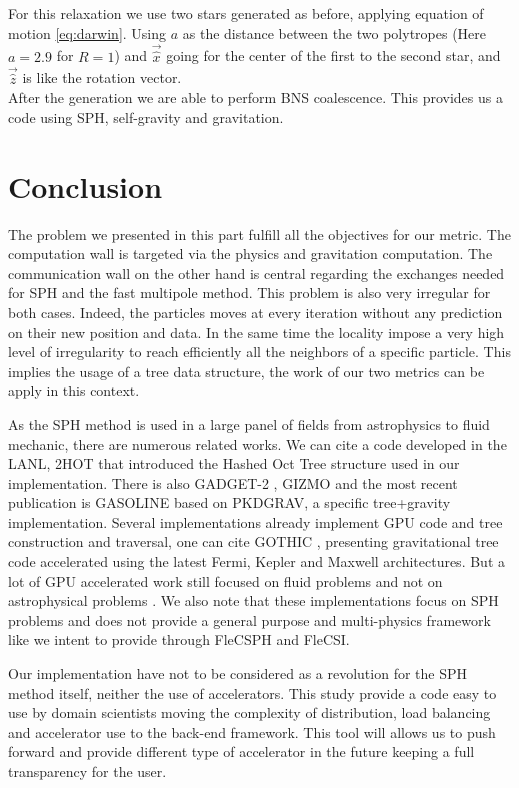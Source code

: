 For this relaxation we use two stars generated as before, applying equation of motion \ref{eq:darwin}.
Using $a$ as the distance between the two polytropes  (Here $a=2.9$ for $R=1$) and $\vec{\hat{x}}$ going for the center of the first to the second star, and $\vec{\hat{z}}$ is like the rotation vector.\\

After the generation we are able to perform BNS coalescence. 
This provides us a code using SPH, self-gravity and gravitation. 

\section{Conclusion}
The problem we presented in this part fulfill all the objectives for our metric. 
The computation wall is targeted via the physics and gravitation computation. 
The communication wall on the other hand is central regarding the exchanges needed for SPH and the fast multipole method. 
This problem is also very irregular for both cases. 
Indeed, the particles moves at every iteration without any prediction on their new position and data. 
In the same time the locality impose a very high level of irregularity to reach efficiently all the neighbors of a specific particle. 
This implies the usage of a tree data structure, the work of our two metrics can be apply in this context. 

As the SPH method is used in a large panel of fields from astrophysics to fluid mechanic, there are numerous related works. 
We can cite a code developed in the LANL, 2HOT \cite{warren20132hot} that introduced the Hashed Oct Tree structure used in our implementation. 
There is also GADGET-2 \cite{springel2005cosmological}, GIZMO \cite{hopkins2014gizmo} and the most recent publication is GASOLINE \cite{wadsley2017gasoline2} based on PKDGRAV, a specific tree+gravity implementation. 
Several implementations already implement GPU code and tree construction and traversal, one can cite GOTHIC \cite{miki2017gothic}, presenting gravitational tree code accelerated using the latest Fermi, Kepler and Maxwell architectures. But a lot of GPU accelerated work still focused on fluid problems and not on astrophysical problems  \cite{harada2007smoothed,crespo2011gpus}.
We also note that these implementations focus on SPH problems and does not provide a general purpose and multi-physics framework like we intent to provide through FleCSPH and FleCSI. 

Our implementation have not to be considered as a revolution for the SPH method itself, neither the use of accelerators. 
This study provide a code easy to use by domain scientists moving the complexity of distribution, load balancing and accelerator use to the back-end framework.
This tool will allows us to push forward and provide different type of accelerator in the future keeping a full transparency for the user. 
